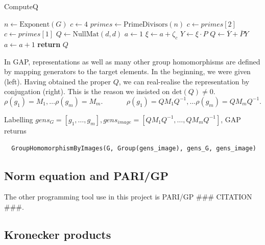 \documentclass[11pt]{article}
\begin{document}
\begin{algorithm}
  \caption{ComputeQ}
  \label{alg:comp_q}
  \begin{algorithmic}
    \State $n \gets \text{Exponent}(G)$
      \State $c \gets 4$
    \Else
      \State $primes \gets \text{PrimeDivisors}(n)$
        \State $c \gets primes[2]$
      \Else
        \State $c \gets primes[1]$
      \EndIf
    \EndIf
    \State $Q \gets \text{NullMat}(d, d)$
    \State $a \gets 1$
      \State $\xi \gets a + \zeta_c$
      \State $Y \gets \xi \cdot P$
      \State $Q \gets \overline{Y} + \overline{P}Y$
      \State $a \gets a+1$
    \EndWhile
    \State \textbf{return} $Q$\
  \end{algorithmic}
\end{algorithm}

In GAP, representations as well as many other group homomorphisms are defined by mapping generators
to the target elements. In the beginning, we were given (left). Having obtained the proper $Q$, we
can real-realise the representation by conjugation (right). This is the reason we insisted on $\text{det}(Q) \neq 0$.
\[\rho(g_1) = M_1, \ldots \rho(g_m) = M_m.~~~~~~~~~~~~~~~\rho(g_1) = QM_1Q^{-1}, \ldots \rho(g_m) = QM_mQ^{-1}.\]

Labelling $gens_G = \left[g_1,\ldots,g_m\right], gens_{image} = \left[QM_1Q^{-1}, \ldots, QM_mQ^{-1}\right]$, GAP returns
\begin{verbatim}
  GroupHomomorphismByImages(G, Group(gens_image), gens_G, gens_image)
\end{verbatim}

\subsection{Norm equation and PARI/GP} \label{sec:pari}

The other programming tool use in this project is PARI/GP \#\#\# CITATION \#\#\#. 

\subsection{Kronecker products} \label{sec:kronecker}
\end{document}
